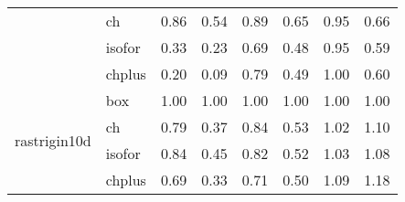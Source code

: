 \begin{table}
\begin{tabular}{llllllll}
 & ch & 0.86 & 0.54 & 0.89 & 0.65 & 0.95 & 0.66 \\
 & isofor & 0.33 & 0.23 & 0.69 & 0.48 & 0.95 & 0.59 \\
 & chplus & 0.20 & 0.09 & 0.79 & 0.49 & 1.00 & 0.60 \\
\cline{1-8}
\multirow[t]{4}{*}{rastrigin10d} & box & 1.00 & 1.00 & 1.00 & 1.00 & 1.00 & 1.00 \\
 & ch & 0.79 & 0.37 & 0.84 & 0.53 & 1.02 & 1.10 \\
 & isofor & 0.84 & 0.45 & 0.82 & 0.52 & 1.03 & 1.08 \\
 & chplus & 0.69 & 0.33 & 0.71 & 0.50 & 1.09 & 1.18 \\
\cline{1-8}
\bottomrule
\end{tabular}
\end{table}
